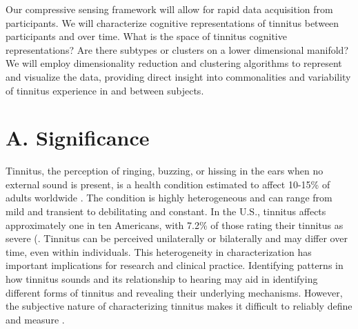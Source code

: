 \documentclass[11pt, notitlepage]{article} %
\begin{document}
Our compressive sensing framework will allow for rapid data acquisition from participants.
We will characterize cognitive representations of tinnitus between participants and over time.
What is the space of tinnitus cognitive representations?
Are there subtypes or clusters on a lower dimensional manifold?
We will employ dimensionality reduction and clustering algorithms to represent and visualize the data,
providing direct insight into commonalities and variability of tinnitus experience in and between subjects.


\newpage

\section*{A. Significance}

Tinnitus, the perception of ringing, buzzing, or hissing in the ears when no external sound is present,
is a health condition estimated to affect 10-15\% of adults worldwide \cite{henryTinnitusEpidemiologicPerspective2020}.
The condition is highly heterogeneous and can range from mild and transient to debilitating and constant.
In the U.S., tinnitus affects approximately one in ten Americans, with 7.2\% of those rating their tinnitus as severe (\cite{bhattPrevalenceSeverityExposures2016}.
Tinnitus can be perceived unilaterally or bilaterally and may differ over time, even within individuals.
This heterogeneity in characterization has important implications for research
and clinical practice.
Identifying patterns in how tinnitus sounds and its relationship to hearing may aid in identifying
different forms of tinnitus and revealing their underlying mechanisms.
However, the subjective nature of characterizing tinnitus makes it difficult
to reliably define and measure \cite{vajsakovicPrinciplesMethodsPsychoacoustic2021}.
\end{document}
